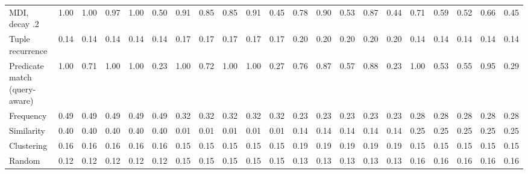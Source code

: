 \begin{tabular}{lrrrrrrrrrrrrrrrrrrrr}
MDI, decay .2 & 1.00 & 1.00 & 0.97 & 1.00 & 0.50 & 0.91 & 0.85 & 0.85 & 0.91 & 0.45 & 0.78 & 0.90 & 0.53 & 0.87 & 0.44 & 0.71 & 0.59 & 0.52 & 0.66 & 0.45 \\
Tuple recurrence & 0.14 & 0.14 & 0.14 & 0.14 & 0.14 & 0.17 & 0.17 & 0.17 & 0.17 & 0.17 & 0.20 & 0.20 & 0.20 & 0.20 & 0.20 & 0.14 & 0.14 & 0.14 & 0.14 & 0.14 \\
Predicate match (query-aware) & 1.00 & 0.71 & 1.00 & 1.00 & 0.23 & 1.00 & 0.72 & 1.00 & 1.00 & 0.27 & 0.76 & 0.87 & 0.57 & 0.88 & 0.23 & 1.00 & 0.53 & 0.55 & 0.95 & 0.29 \\
Frequency & 0.49 & 0.49 & 0.49 & 0.49 & 0.49 & 0.32 & 0.32 & 0.32 & 0.32 & 0.32 & 0.23 & 0.23 & 0.23 & 0.23 & 0.23 & 0.28 & 0.28 & 0.28 & 0.28 & 0.28 \\
Similarity & 0.40 & 0.40 & 0.40 & 0.40 & 0.40 & 0.01 & 0.01 & 0.01 & 0.01 & 0.01 & 0.14 & 0.14 & 0.14 & 0.14 & 0.14 & 0.25 & 0.25 & 0.25 & 0.25 & 0.25 \\
Clustering & 0.16 & 0.16 & 0.16 & 0.16 & 0.16 & 0.15 & 0.15 & 0.15 & 0.15 & 0.15 & 0.19 & 0.19 & 0.19 & 0.19 & 0.19 & 0.15 & 0.15 & 0.15 & 0.15 & 0.15 \\
Random & 0.12 & 0.12 & 0.12 & 0.12 & 0.12 & 0.15 & 0.15 & 0.15 & 0.15 & 0.15 & 0.13 & 0.13 & 0.13 & 0.13 & 0.13 & 0.16 & 0.16 & 0.16 & 0.16 & 0.16 \\
\bottomrule
\end{tabular}
